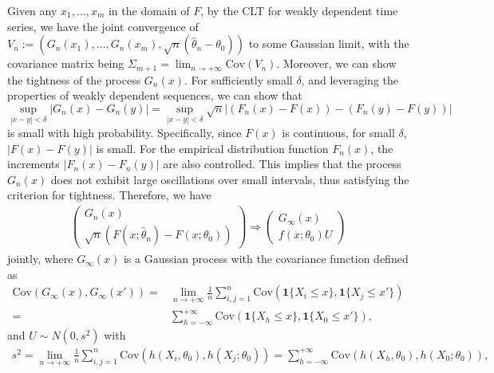 \documentclass[11pt]{article}
\begin{document}
Given any $x_1,\dots,x_m$ in the domain of $F$, by the CLT for weakly dependent time series, we have the joint convergence of 
$V_n:=(G_n(x_1),\dots,G_n(x_m),\sqrt{n}(\hat{\theta}_n-\theta_0))$
to some Gaussian limit, with the covariance matrix being $\Sigma_{m+1}=\lim_{n\rightarrow+\infty}\text{Cov}(V_n)$.
Moreover, we can show the tightness of the process $G_n(x)$. 
For sufficiently small $\delta$, and leveraging the properties of weakly 
dependent sequences, we can show that
\[ \sup_{|x - y| < \delta} |G_n(x) - G_n(y)| = \sup_{|x - y| < \delta} 
\sqrt{n}|(F_n(x) - F(x)) - (F_n(y) - F(y))| \]
is small with high probability.
Specifically, since $F(x)$ is continuous, for small 
$\delta$, $|F(x) - F(y)|$ is small. For the empirical 
distribution function $F_n(x)$, the increments $|F_n(x) - F_n(y)|$ are 
also controlled. 
This implies that the process $G_n(x)$ does not exhibit large oscillations over 
small intervals, thus satisfying the criterion for tightness.
Therefore, we have
\begin{align*}
\begin{pmatrix}
G_n(x)  \\ 
\sqrt{n}(F(x;\hat{\theta}_n)-F(x;\theta_0))
\end{pmatrix}\Rightarrow
\begin{pmatrix}
G_{\infty}(x) \\
f(x;\theta_0)U
\end{pmatrix}
\end{align*}
jointly, where $G_{\infty}(x)$ is a Gaussian process with the covariance function defined as
\begin{align*}
\text{Cov}(G_{\infty}(x),G_{\infty}(x'))=& \lim_{n\rightarrow+\infty}\frac{1}{n}\sum^{n}_{i,j=1}\text{Cov}(\mathbf{1}\{X_i\leq x\},\mathbf{1}\{X_j\leq x'\})
\\=& \sum^{+\infty}_{h=-\infty}\text{Cov}(\mathbf{1}\{X_{h}\leq x\},\mathbf{1}\{X_0\leq x'\}),
\end{align*}
and $U\sim N(0,s^2)$ with 
\begin{align*}
s^2=\lim_{n\rightarrow+\infty}\frac{1}{n}\sum^{n}_{i,j=1}\text{Cov}(h(X_i,\theta_0),h(X_j;\theta_0))
= \sum^{+\infty}_{h=-\infty}\text{Cov}(h(X_{h},\theta_0),h(X_0;\theta_0)),
\end{align*}
\end{document}
